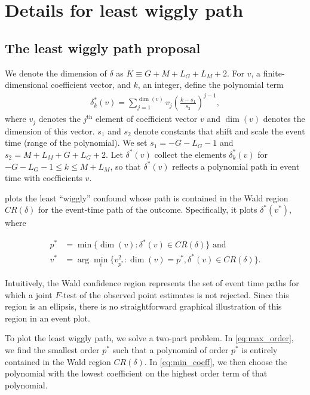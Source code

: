\documentclass[12pt]{article}
\begin{document}
\section{Details for least wiggly path}
\label{sec:smoothest_path}

\subsection{The least wiggly path proposal}

We denote the dimension of $\delta$ as $K \equiv G + M + L_G + L_M + 2$. For $v$, a finite-dimensional coefficient vector, and $k$, an integer, define the polynomial term
\begin{align*}
\delta_k^*(v) = \sum_{j=1}^{\dim(v)} v_j (\frac{k-s_1}{s_2})^{j-1},
\end{align*}
where $v_j$ denotes the $j^{\text{th}}$ element of coefficient vector $v$ and $\dim(v)$ denotes the dimension of this vector. $s_1$ and $s_2$ denote constants that shift and scale the event time (range of the polynomial).
We set $s_1 = -G-L_G-1$ and $s_2 = M + L_M + G + L_G +2$. Let $\delta^*(v)$ collect the elements $\delta_k^*(v)$ for $-G-L_G-1 \leq k \leq M+L_M$, so that $\delta^*(v)$ reflects a polynomial path in event time with coefficients $v$.

\xtevent plots the least ``wiggly'' confound whose path is contained in the Wald region $CR(\delta)$ for the event-time path of the outcome.
Specifically, it plots $\delta^*(v^*)$, where

\begin{align}
p^* &= \min\{\dim(v): \delta^*(v) \in CR(\delta)\} \text{ and}  \label{eq:max_order} \\
v^* &= \arg\min_{v}\{v_{p^*}^2: \dim(v)=p^*, \delta^*(v) \in CR(\delta)\}. \label{eq:min_coeff}
\end{align}

Intuitively, the Wald confidence region represents the set of event time paths for which a joint $F$-test of the observed point estimates is not rejected.
Since this region is an ellipsis, there is no straightforward graphical illustration of this region in an event plot.

To plot the least wiggly path, we solve a two-part problem.
In \eqref{eq:max_order}, we find the smallest order $p^*$ such that a polynomial of order $p^*$ is entirely contained in the Wald region $CR(\delta)$.
In \eqref{eq:min_coeff}, we then choose the polynomial with the lowest coefficient on the highest order term of that polynomial.
\end{document}
